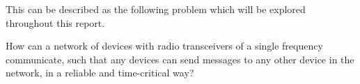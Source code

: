 This can be described as the following problem which will be explored throughout this report.



\bigskip

{\addtolength{\leftskip}{10mm}\addtolength{\rightskip}{10mm}\noindent\hrulefill\it

\noindent How can a network of devices with radio transceivers of a single frequency communicate, such that any devices can send messages to any other device in the network, in a reliable and time-critical way?

\noindent\hrulefill

}



